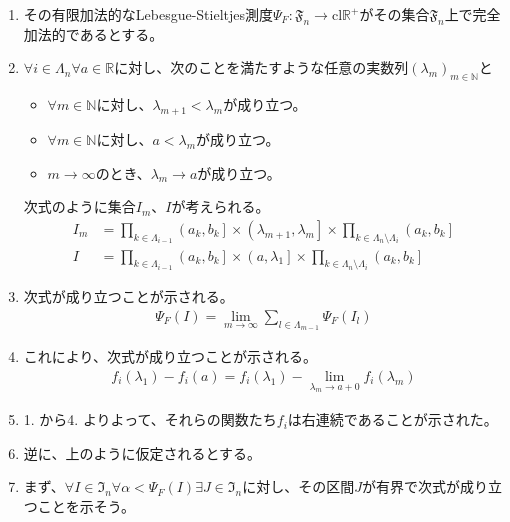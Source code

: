 \documentclass[dvipdfmx]{jsarticle}
\begin{document}
\begin{enumerate}
\item
  その有限加法的なLebesgue-Stieltjes測度$\varPsi_{F}:\mathfrak{F}_{n} \rightarrow \mathrm{cl}\mathbb{R}^{+}$がその集合$\mathfrak{F}_{n}$上で完全加法的であるとする。
\item
  $\forall i \in \varLambda_{n}\forall a \in \mathbb{R}$に対し、次のことを満たすような任意の実数列$\left( \lambda_{m} \right)_{m \in \mathbb{N}}$と
  \begin{itemize}
  \item
    $\forall m \in \mathbb{N}$に対し、$\lambda_{m + 1} < \lambda_{m}$が成り立つ。
  \item
    $\forall m \in \mathbb{N}$に対し、$a < \lambda_{m}$が成り立つ。
  \item
    $m \rightarrow \infty$のとき、$\lambda_{m} \rightarrow a$が成り立つ。
  \end{itemize}
  次式のように集合$I_{m}$、$I$が考えられる。
  \begin{align*}
  I_{m} &= \prod_{k \in \varLambda_{i - 1}} \left( a_{k},b_{k} \right] \times \left( \lambda_{m + 1},\lambda_{m} \right] \times \prod_{k \in \varLambda_{n} \setminus \varLambda_{i}} \left( a_{k},b_{k} \right]\\
  I &= \prod_{k \in \varLambda_{i - 1}} \left( a_{k},b_{k} \right] \times \left( a,\lambda_{1} \right] \times \prod_{k \in \varLambda_{n} \setminus \varLambda_{i}} \left( a_{k},b_{k} \right]
  \end{align*}
\item
  次式が成り立つことが示される。
  \begin{align*}
  \varPsi_{F}(I) = \lim_{m \rightarrow \infty}{\sum_{l \in \varLambda_{m - 1}} {\varPsi_{F}\left( I_{l} \right)}}
  \end{align*}
\item
  これにより、次式が成り立つことが示される。
  \begin{align*}
  f_{i}\left( \lambda_{1} \right) - f_{i}(a) = f_{i}\left( \lambda_{1} \right) - \lim_{\lambda_{m} \rightarrow a + 0}{f_{i}\left( \lambda_{m} \right)}
  \end{align*}
\item
  1. から4. よりよって、それらの関数たち$f_{i}$は右連続であることが示された。
\item
  逆に、上のように仮定されるとする。
\item
  まず、$\forall I \in \mathfrak{I}_{n}\forall\alpha < \varPsi_{F}(I)\exists J \in \mathfrak{I}_{n}$に対し、その区間$J$が有界で次式が成り立つことを示そう。

\end{enumerate}
\end{document}
